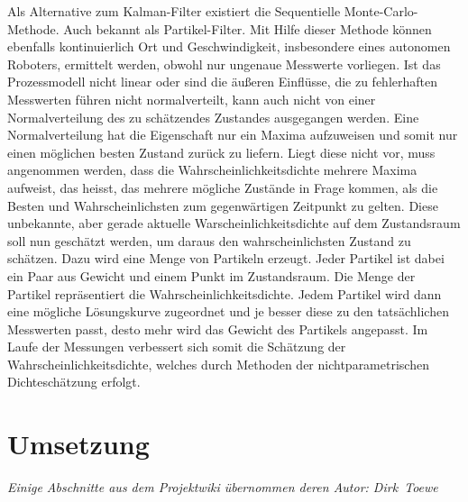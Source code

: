 Als Alternative zum Kalman-Filter existiert die Sequentielle Monte-Carlo-Methode. Auch bekannt als Partikel-Filter. Mit Hilfe dieser Methode können ebenfalls kontinuierlich Ort und Geschwindigkeit, insbesondere eines autonomen Roboters, ermittelt werden, obwohl nur ungenaue Messwerte vorliegen.
Ist das Prozessmodell nicht linear oder sind die äußeren Einflüsse, die zu fehlerhaften Messwerten führen nicht normalverteilt, kann auch nicht von einer Normalverteilung des zu schätzendes Zustandes ausgegangen werden. Eine Normalverteilung hat die Eigenschaft nur ein Maxima aufzuweisen und somit nur einen möglichen besten Zustand zurück zu liefern. Liegt diese nicht vor, muss angenommen werden, dass die Wahrscheinlichkeitsdichte mehrere Maxima aufweist, das heisst, das mehrere mögliche Zustände in Frage kommen, als die Besten und Wahrscheinlichsten zum gegenwärtigen Zeitpunkt zu gelten.
Diese unbekannte, aber gerade aktuelle Warscheinlichkeitsdichte auf dem Zustandsraum soll nun geschätzt werden, um daraus den wahrscheinlichsten Zustand zu schätzen. Dazu wird eine Menge von Partikeln erzeugt. Jeder Partikel ist dabei ein Paar aus Gewicht und einem Punkt im Zustandsraum. Die Menge der Partikel repräsentiert die Wahrscheinlichkeitsdichte.
Jedem Partikel wird dann eine mögliche Lösungskurve zugeordnet und je besser diese zu den tatsächlichen Messwerten passt, desto mehr wird das Gewicht des Partikels angepasst. Im Laufe der Messungen verbessert sich somit die Schätzung der Wahrscheinlichkeitsdichte, welches durch Methoden der nichtparametrischen Dichteschätzung erfolgt.

 
\section{Umsetzung}
\label{lokalisierung_umsetzung_sec}
\authorsection{\editorandreas}
\begin{flushright}\textit{Einige Abschnitte aus dem Projektwiki übernommen deren
Autor: Dirk~Toewe}\end{flushright}
